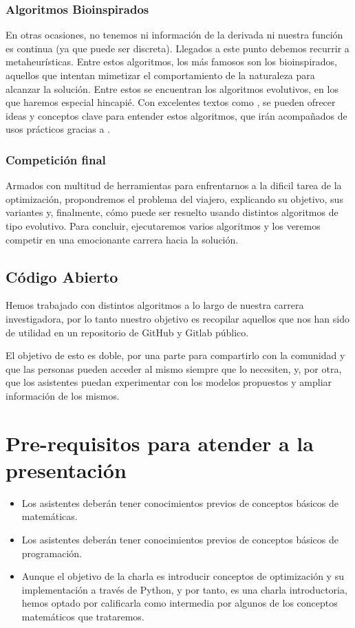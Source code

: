 \documentclass[runningheads]{llncs}
\begin{document}
\subsubsection{Algoritmos Bioinspirados}
En otras ocasiones, no tenemos ni información de la derivada ni nuestra función es continua (ya que puede ser discreta). Llegados a este punto debemos recurrir a metaheurísticas. Entre estos algoritmos, los más famosos son los bioinspirados, aquellos que intentan mimetizar el comportamiento de la naturaleza para alcanzar la solución. Entre estos se encuentran los algoritmos evolutivos, en los que haremos especial hincapié. Con excelentes textos como \cite{brownlee2011clever}, se pueden ofrecer ideas y conceptos clave para entender estos algoritmos, que irán acompañados de usos prácticos gracias a \cite{aarongarrett-inspyred}.
\subsubsection{Competición final}
Armados con multitud de herramientas para enfrentarnos a la dificil tarea de la optimización, propondremos el problema del viajero, explicando su objetivo, sus variantes y, finalmente, cómo puede ser resuelto usando distintos algoritmos de tipo evolutivo. Para concluir, ejecutaremos varios algoritmos y los veremos competir en una emocionante carrera hacia la solución.

\subsection{Código Abierto}

Hemos trabajado con distintos algoritmos a lo largo de nuestra carrera investigadora, por lo tanto nuestro objetivo es recopilar aquellos que nos han sido de utilidad en un repositorio de GitHub y Gitlab público.

El objetivo de esto es doble, por una parte para compartirlo con la comunidad y que las personas pueden acceder al mismo siempre que lo necesiten, y, por otra, que los asistentes puedan experimentar con los modelos propuestos y ampliar información de los mismos.

\section{Pre-requisitos para atender a la presentación}
\begin{itemize}
\item  Los asistentes deber\'an tener conocimientos previos de conceptos básicos de matemáticas. 
\item Los asistentes deber\'an tener conocimientos previos de conceptos básicos de programación. 
\item Aunque el objetivo de la charla es introducir conceptos de optimización y su implementación a través de Python, y por tanto, es una charla introductoria, hemos optado por calificarla como intermedia por algunos de los conceptos matemáticos que trataremos.
\end{itemize}
\end{document}
